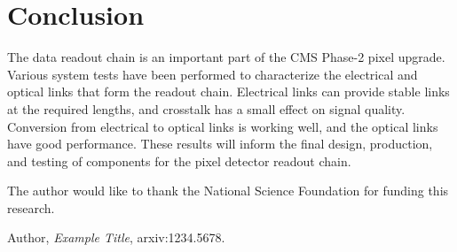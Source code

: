 \documentclass[a4paper,11pt]{article}
\begin{document}
\section{Conclusion}
\label{sec:conclusion}

The data readout chain is an important part of the CMS Phase-2 pixel upgrade.
Various system tests have been performed to characterize the electrical and optical links that form the readout chain.
Electrical links can provide stable links at the required lengths, and crosstalk has a small effect on signal quality.
Conversion from electrical to optical links is working well, and the optical links have good performance.
These results will inform the final design, production, and testing of components for the pixel detector readout chain.


\acknowledgments

The author would like to thank the National Science Foundation for funding this research.


\begin{thebibliography}{99}


Author, \emph{Example Title},
arxiv:1234.5678.

%
%



\end{thebibliography}
\end{document}
